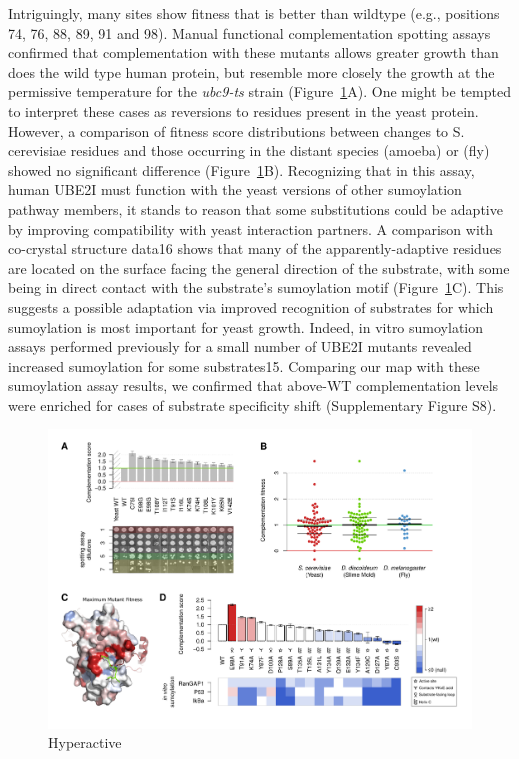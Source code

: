 Intriguingly, many sites show fitness that is better than wildtype (e.g., positions 74, 76, 88, 89, 91 and 98). Manual functional complementation spotting assays confirmed that complementation with these mutants allows greater growth than does the wild type human protein, but resemble more closely the growth at the permissive temperature for the \textit{ubc9-ts} strain (Figure~\ref{fig:hyperactive}A). One might be tempted to interpret these cases as reversions to residues present in the yeast protein. However, a comparison of fitness score distributions between changes to S. cerevisiae  residues and those occurring in the distant species  (amoeba) or  (fly) showed no significant difference (Figure~\ref{fig:hyperactive}B). Recognizing that in this assay, human UBE2I must function with the yeast versions of other sumoylation pathway members, it stands to reason that some substitutions could be adaptive by improving compatibility with yeast interaction partners. A comparison with co-crystal structure data16 shows that many of the apparently-adaptive residues are located on the surface facing the general direction of the substrate, with some being in direct contact with the substrate’s sumoylation motif (Figure~\ref{fig:hyperactive}C). This suggests a possible adaptation via improved recognition of substrates for which sumoylation is most important for yeast growth. Indeed, in vitro sumoylation assays performed previously for a small number of UBE2I mutants revealed increased sumoylation for some substrates15. Comparing our map with these sumoylation assay results, we confirmed that above-WT complementation levels were enriched for cases of substrate specificity shift (Supplementary Figure S8).


\begin{figure}[h!]
	\centering
	\includegraphics[width=\textwidth]{img/hyperactive.pdf}
	\caption{Hyperactive}
	\label{fig:hyperactive}
\end{figure}


